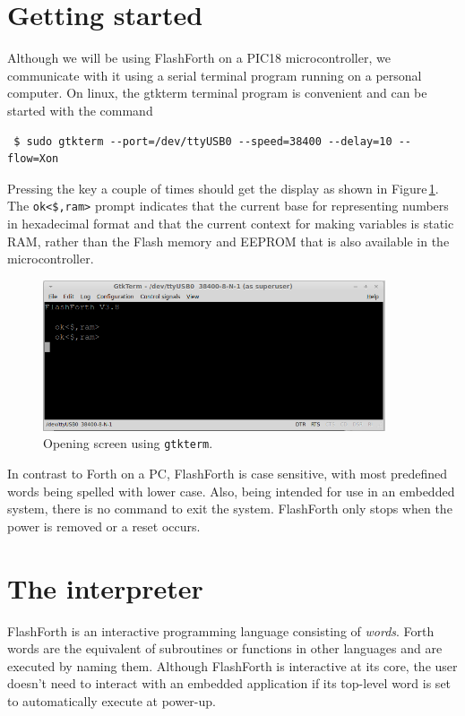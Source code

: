 \documentclass[12pt,a4paper]{article}
\begin{document}
\bigskip
\section{Getting started}
\label{sec:getting-started}
%
Although we will be using FlashForth on a PIC18 microcontroller, we communicate with it
using a serial terminal program running on a personal computer.
On linux, the gtkterm terminal program is convenient and can be started with the command
\begin{verbatim}
 $ sudo gtkterm --port=/dev/ttyUSB0 --speed=38400 --delay=10 --flow=Xon
\end{verbatim}
Pressing the  key a couple of times should get the display 
as shown in Figure\,\ref{fig:opening-screen}.
The \verb!ok<$,ram>! prompt indicates that the current base 
for representing numbers in hexadecimal format 
and that the current context for making variables is static RAM, 
rather than the Flash memory and EEPROM that is also available in the microcontroller.

\begin{figure}[htb]
 \centering
 \includegraphics[width=0.9\textwidth]{../figs/ff-start-screen.png}
 \caption{Opening screen using \texttt{gtkterm}.}
 \label{fig:opening-screen}
\end{figure}

\medskip
In contrast to Forth on a PC, FlashForth is case sensitive, with most predefined words 
being spelled with lower case.
Also, being intended for use in an embedded system, there is no command to exit the system.
FlashForth only stops when the power is removed or a reset occurs.

\bigskip
\section{The interpreter}
\label{sec:interpreter}
%
FlashForth is an interactive programming language consisting of \textit{words}.
Forth words are the equivalent of subroutines or functions in other languages and are
executed by naming them.
Although FlashForth is interactive at its core, the user doesn't need to
interact with an embedded application if its top-level word is set to automatically
execute at power-up.
\end{document}
